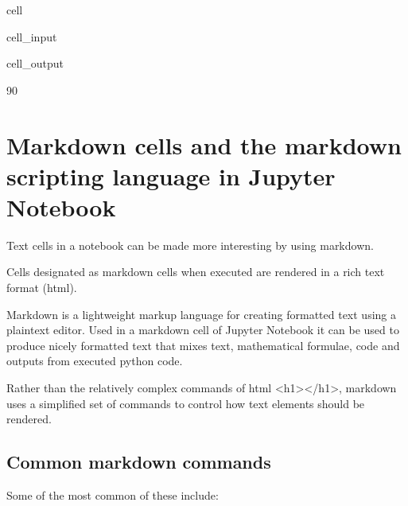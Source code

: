 \documentclass[letterpaper,10pt,english]{jupyterBook}
\begin{document}
\begin{sphinxuseclass}{cell}\begin{sphinxVerbatimInput}

\begin{sphinxuseclass}{cell_input}
\begin{sphinxVerbatim}[commandchars=\\\{\}]
\end{sphinxVerbatim}

\end{sphinxuseclass}\end{sphinxVerbatimInput}
\begin{sphinxVerbatimOutput}

\begin{sphinxuseclass}{cell_output}
\begin{sphinxVerbatim}[commandchars=\\\{\}]
90
\end{sphinxVerbatim}

\end{sphinxuseclass}\end{sphinxVerbatimOutput}

\end{sphinxuseclass}

\section{Markdown cells and the markdown scripting language in Jupyter Notebook}
\label{\detokenize{content/04_PythonEssentials/Intro_Jupyter_notebook:markdown-cells-and-the-markdown-scripting-language-in-jupyter-notebook}}
\sphinxAtStartPar
Text cells in a notebook can be made more interesting by using markdown.

\sphinxAtStartPar
Cells designated as markdown cells when executed are rendered in a rich text format (html).

\sphinxAtStartPar
Markdown is a lightweight markup language for creating formatted text using a plain\sphinxhyphen{}text editor.  Used in a markdown cell of Jupyter Notebook it can be used to produce nicely formatted text that mixes text, mathematical formulae, code and outputs from executed python code.

\sphinxAtStartPar
Rather than the relatively complex commands of html <h1></h1>, markdown uses a simplified set of commands to control how text elements should be rendered.


\subsection{Common markdown commands}
\label{\detokenize{content/04_PythonEssentials/Intro_Jupyter_notebook:common-markdown-commands}}
\sphinxAtStartPar
Some of the most common of these include:
\end{document}
